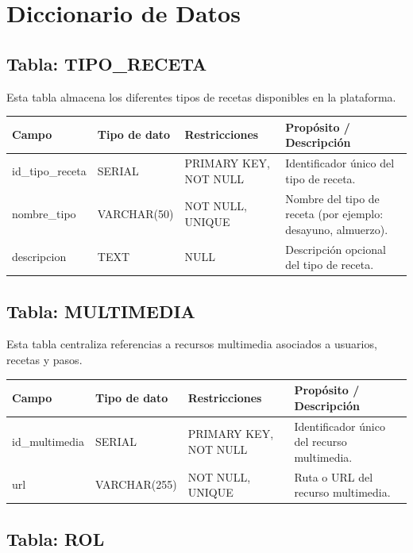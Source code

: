 \documentclass[12pt,a4paper]{article}
\begin{document}
\section{Diccionario de Datos}

\subsection{Tabla: TIPO\_RECETA}

Esta tabla almacena los diferentes tipos de recetas disponibles en la plataforma.

\renewcommand{\arraystretch}{1.3}
\small
\begin{longtable}{|p{3.5cm}|p{2.5cm}|p{3.5cm}|p{5cm}|}
\hline
\textbf{Campo} & \textbf{Tipo de dato} & \textbf{Restricciones} & \textbf{Propósito / Descripción} \\
\hline
id\_tipo\_receta & SERIAL & PRIMARY KEY, NOT NULL & Identificador único del tipo de receta. \\
\hline
nombre\_tipo & VARCHAR(50) & NOT NULL, UNIQUE & Nombre del tipo de receta (por ejemplo: desayuno, almuerzo). \\
\hline
descripcion & TEXT & NULL & Descripción opcional del tipo de receta. \\
\hline
\end{longtable}

\subsection{Tabla: MULTIMEDIA}

Esta tabla centraliza referencias a recursos multimedia asociados a usuarios, recetas y pasos.

\begin{longtable}{|p{3.5cm}|p{2.5cm}|p{3.5cm}|p{5cm}|}
\hline
\textbf{Campo} & \textbf{Tipo de dato} & \textbf{Restricciones} & \textbf{Propósito / Descripción} \\
\hline
id\_multimedia & SERIAL & PRIMARY KEY, NOT NULL & Identificador único del recurso multimedia. \\
\hline
url & VARCHAR(255) & NOT NULL, UNIQUE & Ruta o URL del recurso multimedia. \\
\hline
\end{longtable}

\subsection{Tabla: ROL}
\end{document}
